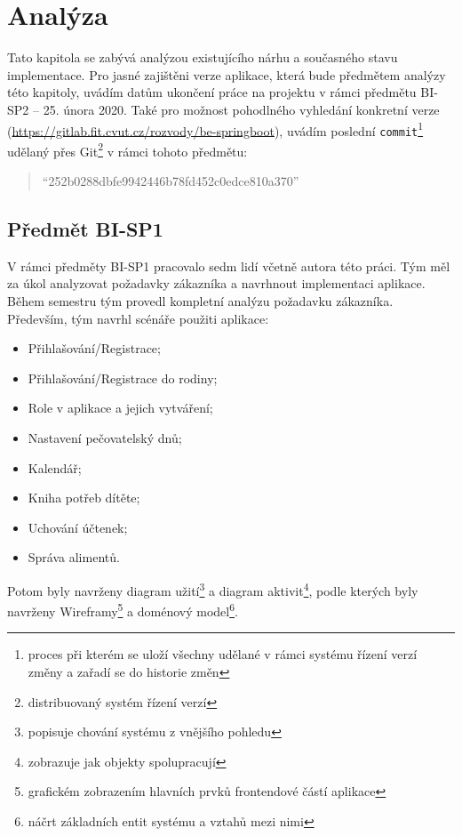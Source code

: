 \chapter{Analýza}\label{chapter:analyza}

Tato kapitola se zabývá analýzou existujícího nárhu a současného stavu implementace. Pro jasné zajištěni verze aplikace, která bude předmětem analýzy této kapitoly, uvádím datům ukončení práce na projektu v rámci předmětu BI-SP2 -- 25. února 2020. Také pro možnost pohodlného vyhledání konkretní verze  (\url{https://gitlab.fit.cvut.cz/rozvody/be-springboot}), uvádím poslední \texttt{commit}\footnote{proces při kterém se uloží všechny udělané v rámci systému řízení verzí změny a zařadí se do historie změn} udělaný přes Git\footnote{ distribuovaný systém řízení verzí} v rámci tohoto předmětu: 
\begin{quote}
    \enquote{252b0288dbfe9942446b78fd452c0edce810a370}
\end{quote}

\section{Předmět BI-SP1}\label{analyza:navrh:sp1}
    V rámci předměty BI-SP1 pracovalo sedm lidí včetně autora této práci. Tým měl za úkol analyzovat požadavky zákazníka a navrhnout implementaci aplikace. Během semestru tým provedl kompletní analýzu požadavku zákazníka. Především, tým navrhl scénáře použiti aplikace:
    \begin{itemize}
	   \item Přihlašování/Registrace;
	   \item Přihlašování/Registrace do rodiny;
	   \item Role v aplikace a jejich vytváření;
	   \item Nastavení pečovatelský dnů;
	   \item Kalendář;
	   \item Kniha potřeb dítěte;
	   \item Uchování účtenek;
	   \item Správa alimentů.
	\end{itemize}
    Potom byly navrženy diagram užití\footnote{popisuje chování systému z vnějšího pohledu} a diagram aktivit\footnote{zobrazuje jak objekty spolupracují}, podle kterých byly navrženy Wireframy\footnote{grafickém zobrazením hlavních prvků frontendové částí aplikace} a doménový model\footnote{náčrt základních entit systému a vztahů mezi nimi}. 
    
